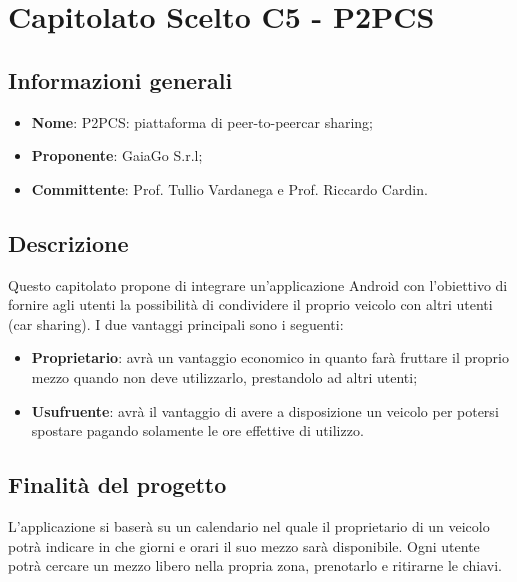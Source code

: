 \section{Capitolato Scelto C5 - P2PCS}
\subsection{Informazioni generali}
\begin{itemize}
\item \textbf{Nome}: P2PCS: piattaforma di peer-to-peer\glosp car sharing;
\item \textbf{Proponente}: GaiaGo S.r.l;
\item \textbf{Committente}: Prof. Tullio Vardanega e Prof. Riccardo Cardin.
\end{itemize}
\subsection{Descrizione}
Questo capitolato propone di integrare un'applicazione Android con l'obiettivo di fornire agli utenti la possibilità di condividere il proprio veicolo con altri utenti (car sharing). 
I due vantaggi principali sono i seguenti:
\begin{itemize}
	\item \textbf{Proprietario}: avrà un vantaggio economico in quanto farà fruttare il proprio mezzo quando non deve utilizzarlo, prestandolo ad altri utenti;
	\item \textbf{Usufruente}: avrà il vantaggio di avere a disposizione un veicolo per potersi spostare pagando solamente le ore effettive di utilizzo.
\end{itemize}
\subsection{Finalità del progetto}
L'applicazione si baserà su un calendario nel quale il proprietario di un veicolo potrà indicare in che giorni e orari il suo mezzo sarà disponibile. Ogni utente potrà cercare un mezzo libero nella propria zona, prenotarlo e ritirarne le chiavi.

